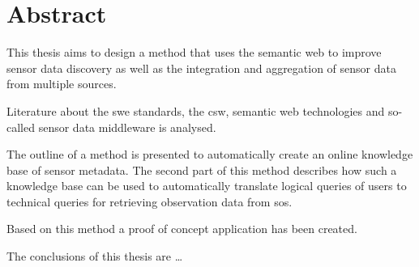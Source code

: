 
\chapter*{Abstract}


This thesis aims to design a method that uses the semantic web to improve sensor data discovery as well as the integration and aggregation of sensor data from multiple sources.

Literature about the \acf{swe} standards, the \acf{csw}, semantic web technologies and so-called sensor data middleware is analysed. 

The outline of a method is presented to automatically create an online knowledge base of sensor metadata. The second part of this method describes how such a knowledge base can be used to automatically translate logical queries of users to technical queries for retrieving observation data from \acf{sos}.  

Based on this method a proof of concept application has been created. 

The conclusions of this thesis are \ldots 
